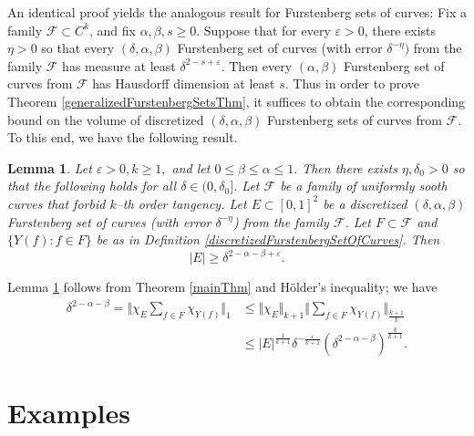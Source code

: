 \documentclass[letterpaper, reqno,11pt]{article}
\numberwithin{equation}{section}
\newcommand{\eps}{\varepsilon}
\numberwithin{thm}{section}
\newtheorem{lem}[thm]{Lemma}
\theoremstyle{remark}
\begin{document}
An identical proof yields the analogous result for Furstenberg sets of curves: Fix a family $\mathcal{F}\subset C^k$, and fix $\alpha,\beta,s\geq 0$. Suppose that for every $\eps>0$, there exists $\eta>0$ so that every $(\delta, \alpha,\beta)$ Furstenberg set of curves (with error $\delta^{-\eta})$ from the family $\mathcal{F}$ has measure at least $\delta^{2-s+\eps}$. Then every $(\alpha,\beta)$ Furstenberg set of curves from $\mathcal{F}$ has Hausdorff dimension at least $s$. Thus in order to prove Theorem \ref{generalizedFurstenbergSetsThm}, it suffices to obtain the corresponding bound on the volume of discretized $(\delta, \alpha, \beta)$ Furstenberg sets of curves from $\mathcal{F}$. To this end, we have the following result.

\begin{lem}\label{volumeBdDiscretizedFurstenbergCurves}
Let $\eps>0, k\geq 1,$ and let $0\leq\beta\leq \alpha\leq 1.$ Then there exists $\eta,\delta_0>0$ so that the following holds for all $\delta\in(0,\delta_0]$. Let $\mathcal{F}$ be a family of uniformly sooth curves that forbid $k$--th order tangency. Let $E\subset[0,1]^2$ be a discretized $(\delta, \alpha, \beta)$ Furstenberg set of curves (with error $\delta^{-\eta}$) from the family $\mathcal{F}$. Let $F\subset\mathcal{F}$ and $\{Y(f)\colon f\in F\}$ be as in Definition \ref{discretizedFurstenbergSetOfCurves}. Then 
\begin{equation}
|E|\geq \delta^{2-\alpha-\beta+\eps}.
\end{equation}
\end{lem}
Lemma \ref{volumeBdDiscretizedFurstenbergCurves} follows from Theorem \ref{mainThm} and H\"older's inequality; we have
\begin{align*}
\delta^{2-\alpha-\beta}=\Big\Vert \chi_E \sum_{f\in F}\chi_{Y(f)}\Big\Vert_1 
&\leq \Big\Vert \chi_E\Big\Vert_{k+1}\Big\Vert \sum_{f\in F}\chi_{Y(f)}\Big\Vert_{\frac{k+1}{k}}\\
&\leq |E|^{\frac{1}{k+1}}\delta^{-\frac{\eps}{k+1}}(\delta^{2-\alpha-\beta})^{\frac{k}{k+1}}.
\end{align*}




\appendix



\section{Examples}\label{examplesSection}
\end{document}
